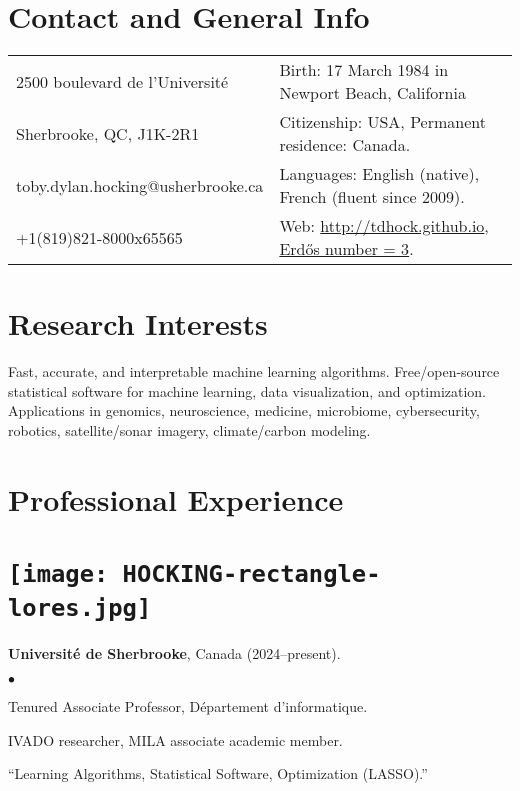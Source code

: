 \documentclass[margin,line]{res}
\newenvironment{list2}{
  \begin{list}{$\bullet$}{%
      \setlength{\itemsep}{0in}
      \setlength{\parsep}{0in} \setlength{\parskip}{0in}
      \setlength{\topsep}{0in} \setlength{\partopsep}{0in} 
      \setlength{\leftmargin}{0.2in}}}{\end{list}}
\begin{document}

\begin{resume}
\section{\sc Contact and General Info}
\vspace{.05in}
\begin{tabular*}{6.1in} {@{\extracolsep{\fill}}ll}
  2500 boulevard de l'Université & Birth: 17 March 1984 in Newport Beach, California\\
  Sherbrooke, QC, J1K-2R1  & Citizenship: USA, Permanent residence: Canada. \\
  toby.dylan.hocking@usherbrooke.ca & Languages: English (native), French
                        (fluent since 2009). \\
  +1(819)821-8000x65565 & Web: \url{http://tdhock.github.io}, \href{https://tdhock.github.io/blog/2022/erdos-number/}{Erd\H{o}s number = 3}. \\
\end{tabular*}

\section{\sc Research Interests}

Fast, accurate, and interpretable machine learning algorithms. Free/open-source statistical software for machine
learning, data visualization, and optimization. Applications in
genomics, neuroscience, medicine, microbiome, cybersecurity, robotics,
satellite/sonar imagery, climate/carbon modeling.

\section{\sc Professional Experience \\ \hspace{0.1cm} \\ \texttt{[image: HOCKING-rectangle-lores.jpg]}}

{\bf Université de Sherbrooke}, Canada (2024--present).\\
\vspace*{-.1in}
\begin{list2}
\item[] Tenured Associate Professor, Département d'informatique.
\item[] IVADO researcher, MILA associate academic member.
\item[] ``Learning Algorithms, Statistical Software, Optimization (LASSO).''
\end{list2}


\end{resume}
\end{document}

